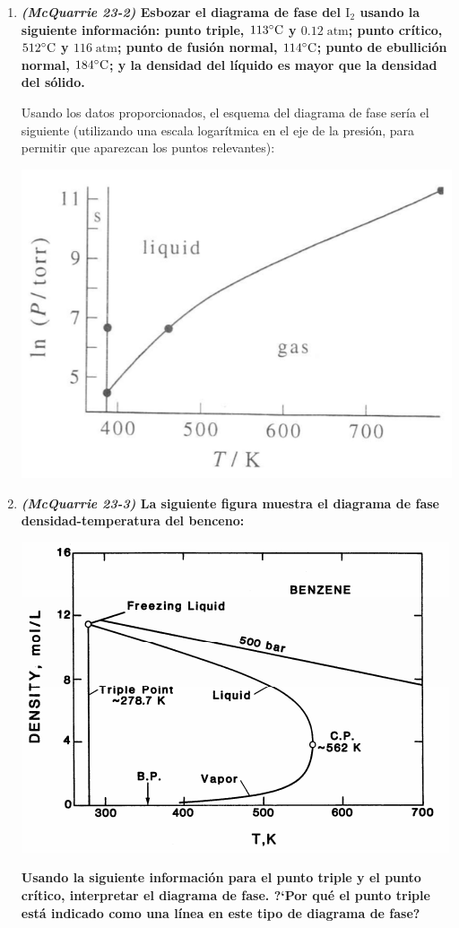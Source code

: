 \documentclass[a4paper,12pt]{article}
\begin{document}
\begin{enumerate}
 \item \textbf{\textit{(McQuarrie 23-2)} Esbozar el diagrama de fase del $\mbox{I}_2$ usando la siguiente informaci\'on: punto triple, $113\celsius$ y $0.12\;\mbox{atm}$; punto cr\'itico, $512\celsius$ y $116\;\mbox{atm}$; punto de fusi\'on normal, $114\celsius$; punto de ebullici\'on normal, $184\celsius$; y la densidad del l\'iquido es mayor que la densidad del s\'olido.} %

Usando los datos proporcionados, el esquema del diagrama de fase ser\'ia el siguiente (utilizando una escala logar\'itmica en el eje de la presi\'on, para permitir que aparezcan los puntos relevantes):

\begin{center}
 \includegraphics[scale=0.55]{figure7.png}
\end{center}

 \item \textbf{\textit{(McQuarrie 23-3)}  La siguiente figura muestra el diagrama de fase densidad-temperatura del benceno:}
\begin{center}
 \includegraphics[scale=0.6]{figure5}
\end{center}
\textbf{Usando la siguiente informaci\'on para el punto triple y el punto cr\'itico, interpretar el diagrama de fase. ?`Por qu\'e el punto triple est\'a indicado como una l\'inea en este tipo de diagrama de fase?}


\end{enumerate}
\end{document}

